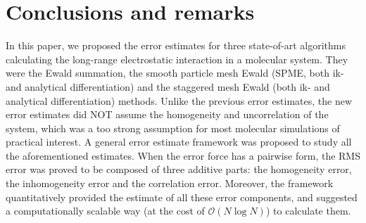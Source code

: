 \documentclass[journal=jacsat,manuscript=article]{achemso}
\newcommand{\redc}[1]{{\color{black} #1}}
\begin{document}
{%

}



\section{Conclusions and remarks}
\label{sec:conclusions}

In this paper, we proposed the error estimates for three state-of-art
algorithms calculating the long-range electrostatic interaction in a
molecular system. They were the Ewald summation, the smooth particle
mesh Ewald (SPME, both ik- and analytical differentiation) and
the staggered mesh Ewald (both ik- and analytical differentiation) methods.
Unlike the previous error estimates, the new error estimates did NOT
assume the homogeneity and uncorrelation of the system, which was a too
strong assumption for most molecular simulations of practical
interest.  A general error estimate framework was proposed
to study all the aforementioned estimates.
When the error force has a pairwise form,
the RMS error was proved to be composed \redc{of} three additive parts:
the homogeneity error, the inhomogeneity error and the correlation
error.
Moreover, the framework quantitatively provided the estimate
of all these error components, and suggested a computationally
scalable way (at the cost of $\mathcal O(N\log N)$) to calculate them.



\end{document}
